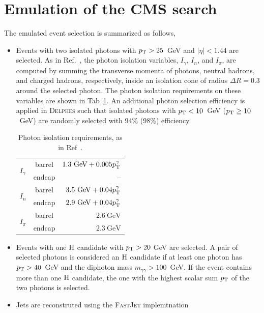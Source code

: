 \section{Emulation of the CMS search}
\label{sec:analysis}

The emulated event selection is summarized as follows,
\begin{itemize}
\item Events with two isolated photons with $p_{\mathrm{T}}>25$~GeV and
  $|\eta|<1.44$ are selected. As in Ref.~\cite{CMSPhoton}, the photon
  isolation variables, $I_{\gamma}$, $I_{n}$, and $I_{\pi}$, are
  computed by summing the transverse momenta of photons, neutral
  hadrons, and charged hadrons, respectively, inside an isolation
  cone of radius $\Delta R=0.3$ around the selected photon. The photon
  isolation requirements on these variables
  are shown in Tab~\ref{tab:isolation}. An additional photon selection
  efficiency is applied in \textsc{Delphes} such that isolated photons with $p_{\mathrm{T}}<10$~GeV ($p_{\mathrm{T}}\geq10$~GeV) are
  randomly selected with 94\% (98\%) efficiency.
\begin{table}
\caption{\label{tab:isolation}Photon isolation requirements, as in Ref~\cite{CMSPhoton}.}
\begin{tabular}{lc|r}
 \multirow{2}{*}{$I_{\gamma}$} & barrel & $1.3~\textrm{GeV} + 0.005p_{\mathrm{T}}^{\gamma}$\\
 & endcap & -- \\\hline
 \multirow{2}{*}{$I_{n}$} & barrel & $3.5~\textrm{GeV} + 0.04p_{\mathrm{T}}^{\gamma}$\\
 & endcap &  $2.9~\textrm{GeV} + 0.04p_{\mathrm{T}}^{\gamma}$ \\\hline
 \multirow{2}{*}{$I_{\pi}$} & barrel & $2.6~\textrm{GeV}$\\
 & endcap &  $2.3~\textrm{GeV}$ \\
\end{tabular}
\end{table}
\item Events with one $\mathrm{H}$ candidate with $p_{\mathrm{T}}>20$ GeV are selected. A pair of selected
  photons is considered an $\mathrm{H}$ candidate if at
  least one photon has $p_{\mathrm{T}}>40$~GeV and the diphoton mass
  $m_{\gamma\gamma}>100$~GeV. If the event contains more than one $\mathrm{H}$ candidate,
  the one with the highest scalar sum $p_{\mathrm{T}}$ of the two photons is selected. 
\item Jets are reconstruted using the \textsc{FastJet}\cite{fastjet} implemtnation

\end{itemize}
